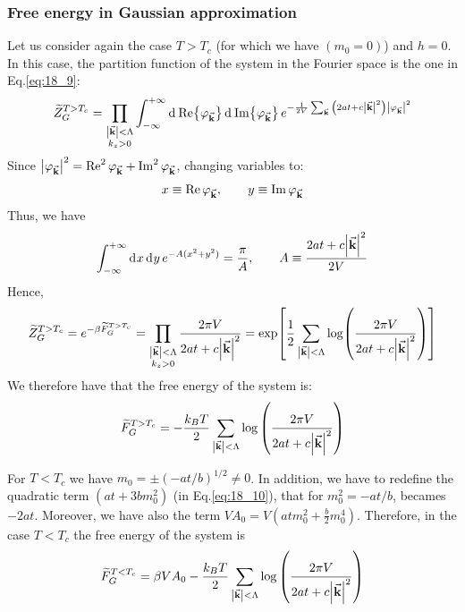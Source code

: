 \documentclass[../../Main/Main.tex]{subfiles}
\begin{document}
\subsubsection{Free energy in Gaussian approximation}
Let us consider again the case \( T>T_c \) (for which we have \( (m_0=0) \)) and \( h=0 \). In this case, the partition function of the system in the Fourier space is the one in Eq.\eqref{eq:18_9}:
\begin{equation*}
  \widetilde{Z}_G^{T>T_c} = \prod_{\substack{ \abs{\va{k}} < \Lambda   \\ k_z >0 } }^{}
   \int_{-\infty }^{+\infty } \dd[]{\Re {\varphi _{\va{k}}}}  \dd[]{\Im {\varphi _{\va{k}}}} e^{- \frac{1}{2V} \sum_{\va{k}}^{} \qty(2at+c \abs{\va{k}}^2 ) \abs{\varphi _{\va{k}}}^2}
\end{equation*}
Since \( \abs{\varphi_{\va{k}}}^2 = \Re^2 \varphi_{\va{k}} + \Im^2 \varphi_{\va{k}} \), changing variables to:
\begin{equation*}
   x \equiv  \Re \varphi _{\va{k}}, \qquad  y \equiv  \Im \varphi _{\va{k}}
\end{equation*}
Thus, we have
\begin{equation*}
  \int_{-\infty }^{+\infty } \dd[]{x} \dd[]{y} e^{-A (x^2+y^2)} = \frac{\pi }{A}, \qquad A \equiv  \frac{2at+c \abs{\va{k}}^2}{2V}
\end{equation*}
Hence,
\begin{equation*}
    \widetilde{Z}_{G}^{T>T_c} = e^{-\beta \widetilde{F}_{G}^{T>T_c} } =  \prod_{\substack{ \abs{\va{k}} < \Lambda   \\ k_z >0 } }^{} \frac{2 \pi V  }{ 2at+c \abs{\va{k}}^2 }
    = \exp [\frac{1}{2} \sum_{\abs{\va{k}}<\Lambda  }^{} \log (\frac{2 \pi V}{2 a t + c \abs{\va{k}}^2 })   ]
\end{equation*}
We therefore have that the free energy of the system is:
\begin{equation}
  \widetilde{F}_{G}^{T>T_c} = - \frac{k_B T}{2}  \sum_{\abs{\va{k}}< \Lambda  }^{}
  \log{\qty(\frac{2 \pi V}{2 a t + c \abs{\va{k}}^2 })}
\end{equation}

\begin{remark}
For \( T<T_c \) we have \( m_0 = \pm (-at/b)^{1/2} \neq 0 \). In addition, we have to redefine the quadratic term \( (at+3bm_0^2) \) (in Eq.\eqref{eq:18_10}), that for \( m_0^2 = - at/b \), becames \( -2at \). Moreover, we have also the term \( V A_0 = V (atm_0^2 + \frac{b}{2} m_0^4) \).
Therefore, in the case \( T<T_c \) the free energy of the system is
\begin{equation}
  \widetilde{F}_{G}^{T<T_c} = \beta V A_0  - \frac{k_B T}{2}  \sum_{\abs{\va{k}}< \Lambda  }^{}
  \log{\qty(\frac{2 \pi V}{ 2 a t + c \abs{\va{k}}^2 })}
\end{equation}
\end{remark}
\end{document}
